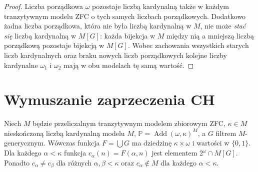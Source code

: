 \begin{proof}
Liczba porządkowa $\omega$ pozostaje
liczbą kardynalną także w każdym
tranzytywnym modelu ZFC
o tych samych liczbach porządkowych.
Dodatkowo żadna liczba porządkowa,
która nie była liczbą kardynalną w $M$,
nie może \emph{stać się}
liczbą kardynalną w $M[G]$:
każda bijekcja w $M$ między nią
a mniejszą liczbą porządkową
pozostaje bijekcją w $M[G]$.
Wobec zachowania wszystkich
starych liczb kardynalnych oraz braku
nowych liczb porządkowych
kolejne liczby kardynalne $\omega_1$
i $\omega_2$ mają w obu modelach
tę samą wartość.
\end{proof}

\section{Wymuszanie zaprzeczenia CH}

\begin{twierdzenie}
\label{thm:forcing34-many-reals}
Niech $M$ będzie przeliczalnym
tranzytywnym modelem zbiorowym ZFC,
$\kappa\in M$ nieskończoną
liczbą kardynalną modelu $M$,
$\mathbb P=\operatorname{Add}(\omega,\kappa)^M$,
a $G$ filtrem $M$-generycznym.
Wówczas funkcja
$F=\bigcup G$ ma dziedzinę
$\kappa\times\omega$ i wartości
w $\{0,1\}$. Dla każdego
$\alpha<\kappa$ funkcja
$c_\alpha(n)=F(\alpha,n)$
jest elementem $2^\omega\cap M[G]$.
Ponadto
$c_\alpha\neq c_\beta$
dla różnych $\alpha,\beta<\kappa$
oraz $c_\alpha\notin M$
dla każdego $\alpha<\kappa$.
\end{twierdzenie}
